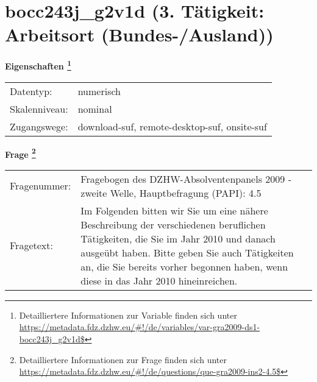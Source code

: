 
    \setcounter{footnote}{0}

    \vspace*{-1.8cm}
	\section{bocc243j\_g2v1d (3. Tätigkeit: Arbeitsort (Bundes-/Ausland))}
	\label{section:bocc243j_g2v1d}



    \vspace*{0.5cm}
    \noindent\textbf{Eigenschaften
	\footnote{Detailliertere Informationen zur Variable finden sich unter
		\url{https://metadata.fdz.dzhw.eu/\#!/de/variables/var-gra2009-ds1-bocc243j_g2v1d$}}}\\
	\begin{tabularx}{\hsize}{@{}lX}
	Datentyp: & numerisch \\
	Skalenniveau: & nominal \\
	Zugangswege: &
	  download-suf, 
	  remote-desktop-suf, 
	  onsite-suf
 \\
    \end{tabularx}



				\vspace*{0.5cm}
                \noindent\textbf{Frage
	                \footnote{Detailliertere Informationen zur Frage finden sich unter
		              \url{https://metadata.fdz.dzhw.eu/\#!/de/questions/que-gra2009-ins2-4.5$}}}\\
				\begin{tabularx}{\hsize}{@{}lX}
					Fragenummer: &
					  Fragebogen des DZHW-Absolventenpanels 2009 - zweite Welle, Hauptbefragung (PAPI):
					  4.5
 \\
					Fragetext: & Im Folgenden bitten wir Sie um eine nähere Beschreibung der verschiedenen beruflichen Tätigkeiten, die Sie im Jahr 2010 und danach ausgeübt haben. Bitte geben Sie auch Tätigkeiten an, die Sie bereits vorher begonnen haben, wenn diese in das Jahr 2010 hineinreichen. \\
				\end{tabularx}





